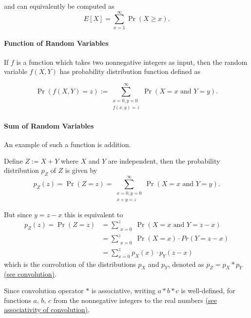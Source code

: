 \documentclass{masterthesis}
\begin{document}
and can equivalently be computed as 
\begin{equation}
    E[X] = \sum_{x=1}^{\infty} \Pr(X \geq x).
\end{equation}

\paragraph*{Function of Random Variables}\label{paragraph:function_of_random_variables}
If $f$ is a function which takes two nonnegative integers as input, then the random variable $f(X, Y)$ has probability distribution function defined as

\begin{equation}
    \Pr(f(X, Y) = z) := \sum_{\substack{x=0, y=0 \\ f(x,y)=z}}^{\infty} \Pr(X = x \text{ and } Y = y).
\end{equation}

\paragraph*{Sum of Random Variables}\label{paragraph:sum_of_random_variables}
An example of such a function is addition. 

Define $Z := X+Y$ where $X$ and $Y$ are independent, then the probability distribution $p_Z$ of $Z$ is given by 
\begin{equation}
    p_Z(z) = \Pr(Z = z) = \sum_{\substack{x=0, y=0 \\ x+y=z}}^{\infty} \Pr(X = x \text{ and } Y = y).
\end{equation}

But since $y = z - x$ this is equivalent to
\begin{align}
    p_Z(z) = \Pr(Z = z) &= \sum_{\substack{x=0}}^{z} \Pr(X = x \text{ and } Y = z - x) \\ 
                        &= \sum_{\substack{x=0}}^{z} \Pr(X = x) \cdot Pr(Y = z - x) \\
                        &= \sum_{x=0}^{z} p_X(x) \cdot p_Y (z - x)
\end{align}
which is the convolution of the distributions $p_X$ and $p_Y$, denoted as $p_Z = p_X * p_Y$ \hyperref[eq:convolution]{(see convolution)}.

Since convolution operator $*$ is associative, writing $a * b * c$ is well-defined, for functions $a$, $b$, $c$ from the nonnegative integers to the real numbers \hyperref[page:convolution_associativity]{(see associativity of convolution)}.
\end{document}
